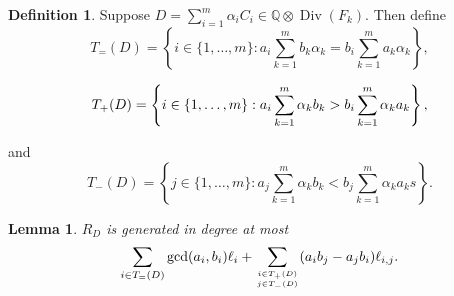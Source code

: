 \documentclass{amsart}
\theoremstyle{plain}
\newtheorem{lem}[thm]{Lemma}
\theoremstyle{definition}
\newtheorem{defn}[thm]{Definition}
\theoremstyle{remark}
\numberwithin{equation}{section}
\DeclareMathOperator\di{Div}
\newcommand\bida{a}
\newcommand\bidb{b}
\begin{document}
\begin{defn}
Suppose $D = \sum_{i=1}^m \alpha_i C_i \in \mathbb{Q} \otimes \di(F_
k)$. Then define 
\begin{equation}\label{eqn:define-T=(D)}
	T_=(D) = \left\{i \in \{1, \ldots, m\}: \bida_i \sum_{k=1}^m \bidb_k 
\alpha_k = \bidb_i \sum_{k=1}^m \bida_k \alpha_k \right\},
\end{equation}

\begin{equation}\label{eqn:define-T+(D)}
	T_+(D) = \left\{ i \in \{1, \ldots, m\}:  \vphantom{\sum_{k=1}^m} 
\bida_i \sum_{k=1}^m \alpha_k \bidb_k > \bidb_i \sum_{k=1}^m \alpha_k \bida_k 
\right\},
\end{equation}

\noindent
and
\begin{equation}\label{eqn:define-T-(D)}
	T_-(D) = \left\{ j \in \{1, \ldots, m\}: \bida_j \sum_{k=1}^m \alpha_
k \bidb_k < \bidb_j \sum_{k=1}^m \alpha_k \bida_k s \right\}.
\end{equation}
\end{defn}

\begin{lem}
$R_D$ is generated in degree at most
\[
	\sum_{i\in T_=(D)} \gcd(\bida_i, \bidb_i) \ell_i + \sum_{i\in T_+(D) \atop j\in T_-(D)} (\bida_i \bidb_j- \bida_j \bidb_i)\ell_{i,j}.
\]
\end{lem}
\end{document}
